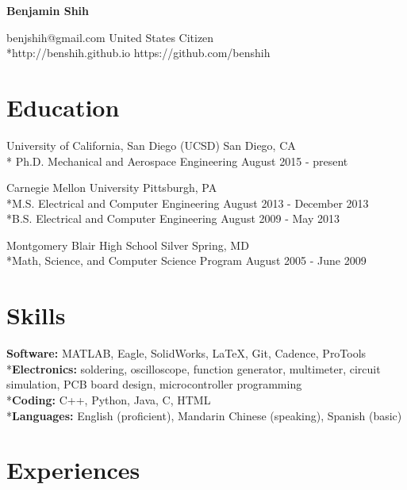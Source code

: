 \documentclass{res}
\begin{document}
 

\begin{center}
{\Large \textbf{Benjamin Shih}}
\end{center}
\vspace{-0.1in}
benjshih@gmail.com \hfill United States Citizen
\\*http://benshih.github.io \hfill https://github.com/benshih


\vspace{-0.1in}
\section{Education}
\vspace{0.05in} 
 
University of California, San Diego (UCSD) \hfill San Diego, CA
\\* Ph.D. Mechanical and Aerospace Engineering \hfill August 2015 - present
 
Carnegie Mellon University \hfill Pittsburgh, PA
\\*M.S. Electrical and Computer Engineering \hfill August 2013 - December 2013
\\*B.S. Electrical and Computer Engineering \hfill August 2009 - May 2013

Montgomery Blair High School \hfill Silver Spring, MD
\\*Math, Science, and Computer Science Program \hfill August 2005 - June 2009


\vspace{-0.1in}
\section{Skills} %
\vspace{0.05in}
{\bf Software: } MATLAB, Eagle, SolidWorks, LaTeX, Git, Cadence, ProTools
\\*{\bf Electronics: } soldering, oscilloscope, function generator, multimeter, circuit simulation, PCB board design, microcontroller programming
\\*{\bf Coding: } C++, Python, Java, C, HTML
\\*{\bf Languages: } English (proficient), Mandarin Chinese (speaking), Spanish (basic)




\vspace{-0.1in}
\section{Experiences}
\vspace{0.05in} 
\end{document}
